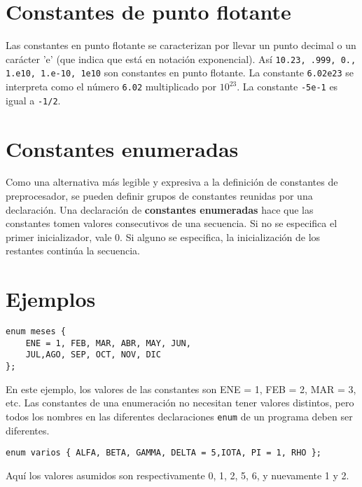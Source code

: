 \section{Constantes de punto flotante}
Las constantes en punto flotante se caracterizan por llevar un punto decimal o un carácter 'e' (que
indica que está en notación exponencial). Así \texttt{10.23, .999, 0., 1.e10, 1.e-10, 1e10} son constantes en
punto flotante. La constante \texttt{6.02e23} se interpreta como el número \texttt{6.02} multiplicado por $10^{23}$. La
constante \texttt{-5e-1} es igual a \texttt{-1/2}.

\section{Constantes enumeradas}
Como una alternativa más legible y expresiva a la definición de constantes de preprocesador, se
pueden definir grupos de constantes reunidas por una declaración. Una declaración de \textbf{constantes
enumeradas} hace que las constantes tomen valores consecutivos de una secuencia. Si no se especifica el primer inicializador, vale 0. Si alguno se especifica, la inicialización de los
restantes continúa la secuencia.

\section{Ejemplos}
\begin{lstlisting}
enum meses { 
	ENE = 1, FEB, MAR, ABR, MAY, JUN, 
	JUL,AGO, SEP, OCT, NOV, DIC 
};
\end{lstlisting}
En este ejemplo, los valores de las constantes son ENE = 1, FEB = 2, MAR = 3, etc.
Las constantes de una enumeración no necesitan tener valores distintos, pero todos los nombres en las
diferentes declaraciones \texttt{enum} de un programa deben ser diferentes.
\begin{lstlisting}
enum varios { ALFA, BETA, GAMMA, DELTA = 5,IOTA, PI = 1, RHO };	
\end{lstlisting}
Aquí los valores asumidos son respectivamente 0, 1, 2, 5, 6, y nuevamente 1 y 2.

